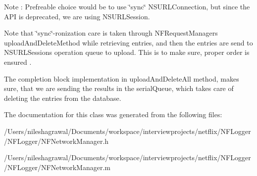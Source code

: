 Note \+: Prefreable choice would be to use \char`\"{}sync\char`\"{} N\+S\+U\+R\+L\+Connection, but since the A\+PI is deprecated, we are using N\+S\+U\+R\+L\+Session.

Note that \char`\"{}sync\char`\"{}-\/ronization care is taken through N\+F\+Request\+Manager\textquotesingle{}s upload\+And\+Delete\+Method while retrieving entries, and then the entries are send to N\+S\+U\+R\+L\+Session\textquotesingle{}s operation queue to upload. This is to make sure, proper order is ensured .

The completion block implementation in upload\+And\+Delete\+All method, makes sure, that we are sending the results in the serial\+Queue, which takes care of deleting the entries from the database. 

The documentation for this class was generated from the following files\+:\begin{DoxyCompactItemize}
\item 
/\+Users/nileshagrawal/\+Documents/workspace/interviewprojects/netflix/\+N\+F\+Logger/\+N\+F\+Logger/N\+F\+Network\+Manager.\+h\item 
/\+Users/nileshagrawal/\+Documents/workspace/interviewprojects/netflix/\+N\+F\+Logger/\+N\+F\+Logger/N\+F\+Network\+Manager.\+m\end{DoxyCompactItemize}
